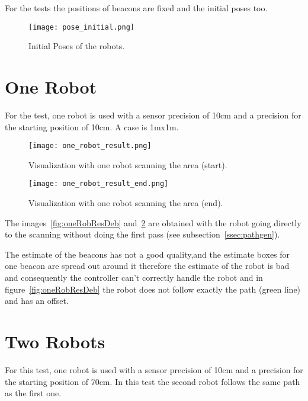 For the tests the positions of beacons are fixed and the initial poses too.

\begin{figure}[H]
\centering
\texttt{[image: pose\_initial.png]}
\caption{Initial Poses of the robots.}
\label{fig:initialPose}
\end{figure}

\section{One Robot}

For the test, one robot is used with a sensor precision of 10cm  and a precision for the starting position of 10cm. A case is 1mx1m.

\begin{figure}[H]
\centering
\begin{minipage}[b]{0.4\textwidth}
\texttt{[image: one\_robot\_result.png]}
\caption{Visualization with one robot scanning the area (start).}
\label{fig:oneRobResDeb}
\end{minipage}
\begin{minipage}[b]{0.4\textwidth}
\texttt{[image: one\_robot\_result\_end.png]}
\caption{Visualization with one robot scanning the area (end).}
\label{fig:oneRobResEnd}
\end{minipage}
\end{figure}

The images~\ref{fig:oneRobResDeb} and~\ref{fig:oneRobResEnd} are obtained with the robot going directly to the scanning without doing the first pass (see subsection~\ref{ssec:pathgen}).

The estimate of the beacons has not a good quality,and the estimate boxes for one beacon are spread out around it therefore the estimate of the robot  is bad and consequently the controller can't correctly handle the robot and in figure~\ref{fig:oneRobResDeb} the robot does not follow exactly the path (green line) and has an offset.

\section{Two Robots}

For this test, one robot is used with a sensor precision of 10cm  and a precision for the starting position of 70cm. In this test the second robot follows the same path as the first one.

